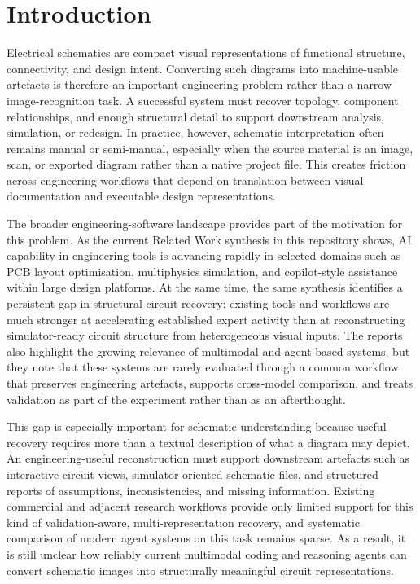 \section{Introduction}

Electrical schematics are compact visual representations of functional structure, connectivity, and design intent. Converting such diagrams into machine-usable artefacts is therefore an important engineering problem rather than a narrow image-recognition task. A successful system must recover topology, component relationships, and enough structural detail to support downstream analysis, simulation, or redesign. In practice, however, schematic interpretation often remains manual or semi-manual, especially when the source material is an image, scan, or exported diagram rather than a native project file. This creates friction across engineering workflows that depend on translation between visual documentation and executable design representations.

The broader engineering-software landscape provides part of the motivation for this problem. As the current Related Work synthesis in this repository shows, AI capability in engineering tools is advancing rapidly in selected domains such as PCB layout optimisation, multiphysics simulation, and copilot-style assistance within large design platforms. At the same time, the same synthesis identifies a persistent gap in structural circuit recovery: existing tools and workflows are much stronger at accelerating established expert activity than at reconstructing simulator-ready circuit structure from heterogeneous visual inputs. The reports also highlight the growing relevance of multimodal and agent-based systems, but they note that these systems are rarely evaluated through a common workflow that preserves engineering artefacts, supports cross-model comparison, and treats validation as part of the experiment rather than as an afterthought.

This gap is especially important for schematic understanding because useful recovery requires more than a textual description of what a diagram may depict. An engineering-useful reconstruction must support downstream artefacts such as interactive circuit views, simulator-oriented schematic files, and structured reports of assumptions, inconsistencies, and missing information. Existing commercial and adjacent research workflows provide only limited support for this kind of validation-aware, multi-representation recovery, and systematic comparison of modern agent systems on this task remains sparse. As a result, it is still unclear how reliably current multimodal coding and reasoning agents can convert schematic images into structurally meaningful circuit representations.

